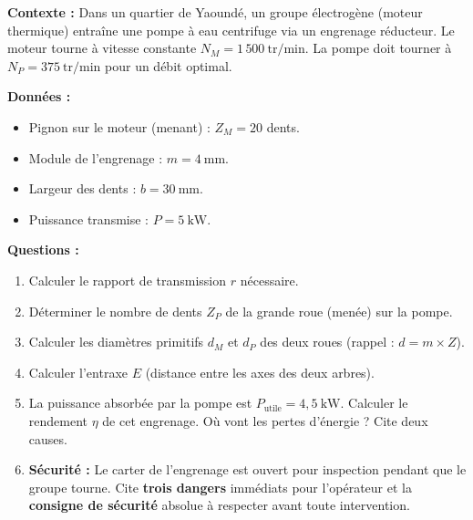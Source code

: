 \documentclass[11pt]{article}
\begin{document}
\begin{exercice}
\textbf{Contexte :} Dans un quartier de Yaoundé, un groupe électrogène (moteur thermique) entraîne une pompe à eau centrifuge via un engrenage réducteur. Le moteur tourne à vitesse constante $N_M = 1\,500\ \text{tr/min}$. La pompe doit tourner à $N_P = 375\ \text{tr/min}$ pour un débit optimal.

\textbf{Données :}
\begin{itemize}
    \item Pignon sur le moteur (menant) : $Z_M = 20$ dents.
    \item Module de l'engrenage : $m = 4\ \text{mm}$.
    \item Largeur des dents : $b = 30\ \text{mm}$.
    \item Puissance transmise : $P = 5\ \text{kW}$.
\end{itemize}

\textbf{Questions :}
\begin{enumerate}
    \item Calculer le rapport de transmission $r$ nécessaire.
    \item Déterminer le nombre de dents $Z_P$ de la grande roue (menée) sur la pompe.
    \item Calculer les diamètres primitifs $d_M$ et $d_P$ des deux roues (rappel : $d = m \times Z$).
    \item Calculer l'entraxe $E$ (distance entre les axes des deux arbres).
    \item La puissance absorbée par la pompe est $P_{\text{utile}} = 4,5\ \text{kW}$. Calculer le rendement $\eta$ de cet engrenage. Où vont les pertes d'énergie ? Cite deux causes.
    \item \textbf{Sécurité :} Le carter de l'engrenage est ouvert pour inspection pendant que le groupe tourne. Cite \textbf{trois dangers} immédiats pour l'opérateur et la \textbf{consigne de sécurité} absolue à respecter avant toute intervention.
\end{enumerate}
\end{exercice}
\end{document}
